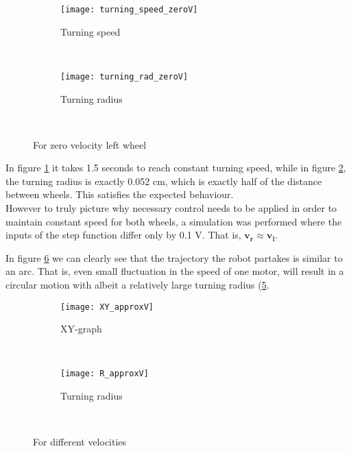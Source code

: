 \begin{figure}[h]
    \centering
    \begin{subfigure}[h]{0.47\textwidth}
        \texttt{[image: turning\_speed\_zeroV]}
        \caption{Turning speed}
        \label{fig:TzeroV}
    \end{subfigure}
    ~ %
    \begin{subfigure}[h]{0.47\textwidth}
        \texttt{[image: turning\_rad\_zeroV]}
        \caption{Turning radius}
        \label{fig:RzeroV}
    \end{subfigure}
    ~ %
    \caption{For zero velocity left wheel}\label{fig:zeroV}
\end{figure}

In figure \ref{fig:TzeroV} it takes 1.5 seconds to reach constant turning speed, while in figure \ref{fig:RzeroV}, the turning radius is exactly 0.052 cm, which is exactly half of the distance between wheels. This satisfies the expected behaviour. \\


However to truly picture why necessary control needs to be applied in order to maintain constant speed for both wheels, a simulation was performed where the inputs of the step function differ only by 0.1 V. That is, $\boldsymbol{v_r \approx v_l}$. 

In figure \ref{fig:approxV} we can clearly see that the trajectory the robot partakes is similar to an arc. That is, even small fluctuation in the speed of one motor, will result in a circular motion with albeit a relatively large turning radius (\ref{fig:RapproxV}. 

\newpage

\begin{figure}[h]
    \centering
    \begin{subfigure}[h]{0.47\textwidth}
        \texttt{[image: XY\_approxV]}
        \caption{XY-graph}
        \label{fig:approxV}
    \end{subfigure}
    ~ %
    \begin{subfigure}[h]{0.47\textwidth}
        \texttt{[image: R\_approxV]}
        \caption{Turning radius}
        \label{fig:RapproxV}
    \end{subfigure}
    ~ %
    \caption{For different velocities}\label{fig:approxV}
\end{figure}

